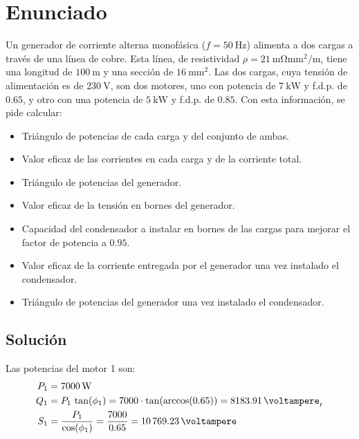 
\section{Enunciado}
                                              
Un generador de corriente alterna monofásica ($f=\qty{50}{\hertz}$) alimenta a dos cargas a través de una línea de cobre. Esta línea, de resistividad $\rho=\qty{21}{\milli\ohm\milli\meter\squared\per\meter}$, tiene una longitud de $\qty{100}{\meter}$ y una sección de $\qty{16}{\milli\meter\squared}$. Las dos cargas, cuya tensión de alimentación es de $\qty{230}{\volt}$, son dos motores, uno con potencia de $\qty{7}{\kilo\watt}$ y f.d.p. de $0.65$, y otro con una potencia de $\qty{5}{\kilo\watt}$ y f.d.p. de $0.85$. Con esta información, se pide calcular:
\begin{itemize}
    \item Triángulo de potencias de cada carga y del conjunto de ambas.
    \item Valor eficaz de las corrientes en cada carga y de la corriente   total.
    \item Triángulo de potencias del generador.
    \item Valor eficaz de la tensión en bornes del generador.
    \item Capacidad del condensador a instalar en bornes de las cargas para mejorar el factor de potencia a $0.95$.
    \item Valor eficaz de la corriente entregada por el generador una vez instalado el condensador.
    \item Triángulo de potencias del generador una vez instalado el condensador.
\end{itemize}

\subsection*{Solución}

Las potencias del motor 1 son:
\begin{align*}
  P_1&=\qty{7000}{\watt}\\ 
  Q_1&=P_1\,\tan(\phi_1)=7000\cdot
                    \tan(\arccos(0.65))=\qty{8183.91}{\voltampere_r}\\
  S_1&=\dfrac{P_1}{\cos(\phi_1)}=\dfrac{7000}{0.65}=\qty{10769.23}{\voltampere}
\end{align*}

